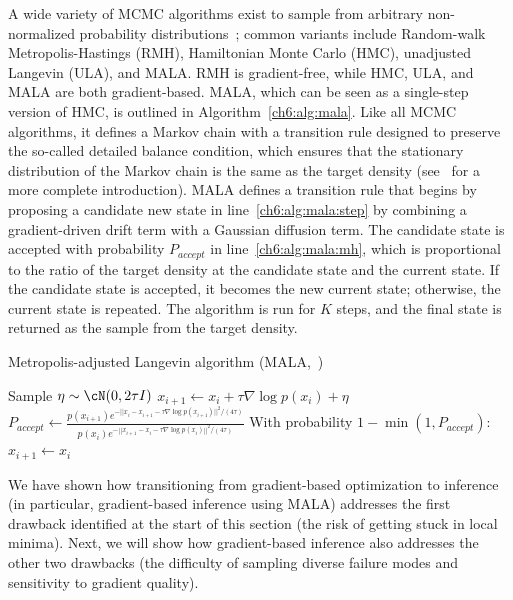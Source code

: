 A wide variety of MCMC algorithms exist to sample from arbitrary non-normalized probability distributions~\cite{geyerIntroductionMarkovChain2011}; common variants include Random-walk Metropolis-Hastings (RMH), Hamiltonian Monte Carlo (HMC), unadjusted Langevin (ULA), and MALA. RMH is gradient-free, while HMC, ULA, and MALA are both gradient-based. MALA, which can be seen as a single-step version of HMC, is outlined in Algorithm~\ref{ch6:alg:mala}. Like all MCMC algorithms, it defines a Markov chain with a transition rule designed to preserve the so-called detailed balance condition, which ensures that the stationary distribution of the Markov chain is the same as the target density (see~\cite{geyerIntroductionMarkovChain2011,aiama} for a more complete introduction). MALA defines a transition rule that begins by proposing a candidate new state in line~\ref{ch6:alg:mala:step} by combining a gradient-driven drift term with a Gaussian diffusion term. The candidate state is accepted with probability $P_{accept}$ in line~\ref{ch6:alg:mala:mh}, which is proportional to the ratio of the target density at the candidate state and the current state. If the candidate state is accepted, it becomes the new current state; otherwise, the current state is repeated. The algorithm is run for $K$ steps, and the final state is returned as the sample from the target density.

\begin{algorithm}
    \caption{Metropolis-adjusted Langevin algorithm (MALA,~\cite{maSamplingCanBe2019,robertsLangevinDiffusionsMetropolisHastings2002})\label{ch6:alg:mala}}
    \DontPrintSemicolon
    {
    Sample $\eta \sim \cN(0, 2\tau I)$ \;
    $x_{i+1} \gets x_i + \tau \nabla \log p(x_i) + \eta$ \;\label{ch6:alg:mala:step}
    $P_{accept} \gets \frac{p(x_{i+1}) e^{-||x_i - x_{i+1} - \tau \nabla \log p(x_{i+1})||^2 / (4\tau)}}{p(x_{i}) e^{-||x_{i+1} - x_{i} - \tau \nabla \log p(x_{i})||^2 / (4\tau)}}$ \;
    With probability $1 - \min(1, P_{accept})$:
    \hspace{2em}$x_{i+1} \gets x_{i}$ \;\label{ch6:alg:mala:mh}
    }
\end{algorithm}

We have shown how transitioning from gradient-based optimization to inference (in particular, gradient-based inference using MALA) addresses the first drawback identified at the start of this section (the risk of getting stuck in local minima). Next, we will show how gradient-based inference also addresses the other two drawbacks (the difficulty of sampling diverse failure modes and sensitivity to gradient quality).

